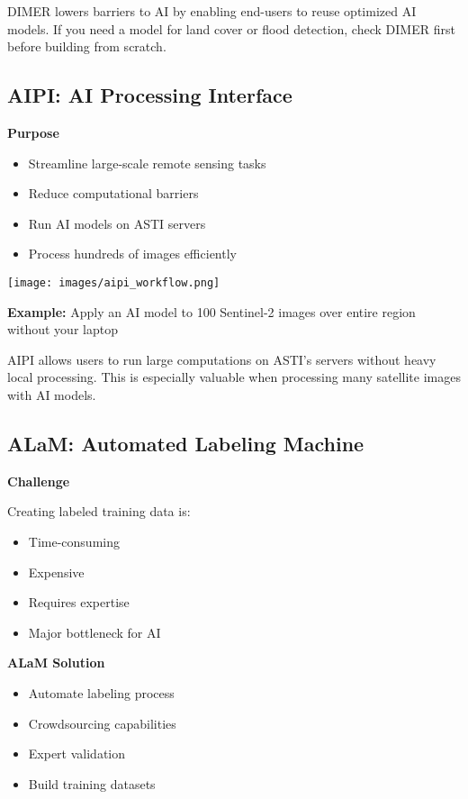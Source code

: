 \documentclass[
  letterpaper,
  DIV=11,
  numbers=noendperiod]{scrartcl}
\providecommand{\tightlist}{%
  \setlength{\itemsep}{0pt}\setlength{\parskip}{0pt}}
\begin{document}
DIMER lowers barriers to AI by enabling end-users to reuse optimized AI
models. If you need a model for land cover or flood detection, check
DIMER first before building from scratch.

\subsection{AIPI: AI Processing
Interface}\label{aipi-ai-processing-interface}

\textbf{Purpose}

\begin{itemize}
\tightlist
\item
  Streamline large-scale remote sensing tasks
\item
  Reduce computational barriers
\item
  Run AI models on ASTI servers
\item
  Process hundreds of images efficiently
\end{itemize}

\texttt{[image: images/aipi\_workflow.png]}

\textbf{Example:} Apply an AI model to 100 Sentinel-2 images over entire
region without your laptop

AIPI allows users to run large computations on ASTI's servers without
heavy local processing. This is especially valuable when processing many
satellite images with AI models.

\subsection{ALaM: Automated Labeling
Machine}\label{alam-automated-labeling-machine}

\textbf{Challenge}

Creating labeled training data is:

\begin{itemize}
\tightlist
\item
  Time-consuming
\item
  Expensive
\item
  Requires expertise
\item
  Major bottleneck for AI
\end{itemize}

\textbf{ALaM Solution}

\begin{itemize}
\tightlist
\item
  Automate labeling process
\item
  Crowdsourcing capabilities
\item
  Expert validation
\item
  Build training datasets
\end{itemize}
\end{document}
